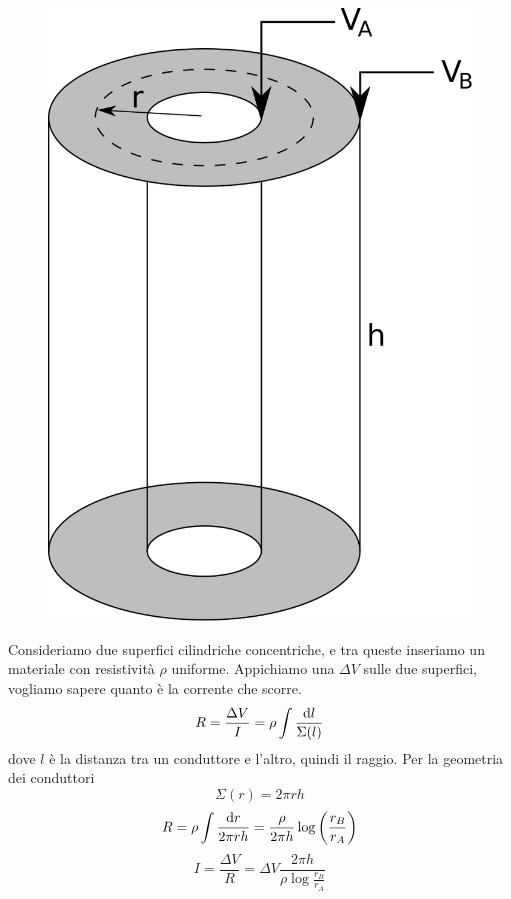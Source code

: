 \begin{Es}
\begin{figure}[htbp]
 \centering
 \includegraphics[scale=0.35]{immagini/fisica2/conduttore_cilindrico}
\end{figure}
 Consideriamo due superfici cilindriche concentriche, e tra queste inseriamo un materiale con resistività $\rho$ uniforme. Appichiamo una $\Delta V$ sulle due superfici, vogliamo sapere quanto è la corrente che scorre.
\begin{equation*}
 R = \frac{\Delta V}{I} = \rho\int\frac{\mathrm{d} l}{\Sigma(l)}
\end{equation*}
dove $l$ è la distanza tra un conduttore e l'altro, quindi il raggio. Per la geometria dei conduttori
\begin{equation*}
 \Sigma(r) = 2\pi rh
\end{equation*}
\begin{equation*}
 R = \rho\int\frac{\mathrm{d} r}{2\pi rh}=\frac{\rho}{2\pi h}\log\left(\frac{r_B}{r_A}\right)
\end{equation*}
\begin{equation*}
 I = \frac{\Delta V}{R} = \Delta V \frac{2\pi h}{\rho\log\frac{r_B}{r_A}}
\end{equation*}
\end{Es}


